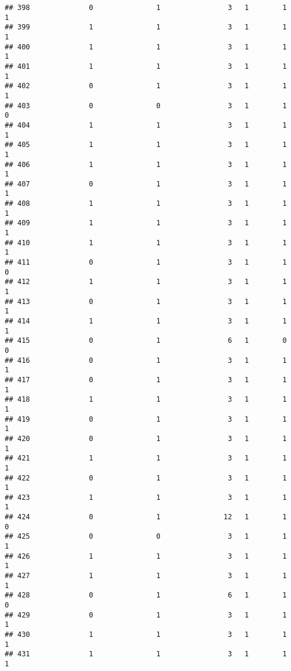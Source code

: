 \documentclass[]{article}
\begin{document}
\begin{verbatim}
## 398              0               1                3   1        1        1
## 399              1               1                3   1        1        1
## 400              1               1                3   1        1        1
## 401              1               1                3   1        1        1
## 402              0               1                3   1        1        1
## 403              0               0                3   1        1        0
## 404              1               1                3   1        1        1
## 405              1               1                3   1        1        1
## 406              1               1                3   1        1        1
## 407              0               1                3   1        1        1
## 408              1               1                3   1        1        1
## 409              1               1                3   1        1        1
## 410              1               1                3   1        1        1
## 411              0               1                3   1        1        0
## 412              1               1                3   1        1        1
## 413              0               1                3   1        1        1
## 414              1               1                3   1        1        1
## 415              0               1                6   1        0        0
## 416              0               1                3   1        1        1
## 417              0               1                3   1        1        1
## 418              1               1                3   1        1        1
## 419              0               1                3   1        1        1
## 420              0               1                3   1        1        1
## 421              1               1                3   1        1        1
## 422              0               1                3   1        1        1
## 423              1               1                3   1        1        1
## 424              0               1               12   1        1        0
## 425              0               0                3   1        1        1
## 426              1               1                3   1        1        1
## 427              1               1                3   1        1        1
## 428              0               1                6   1        1        0
## 429              0               1                3   1        1        1
## 430              1               1                3   1        1        1
## 431              1               1                3   1        1        1

\end{verbatim}
\end{document}
